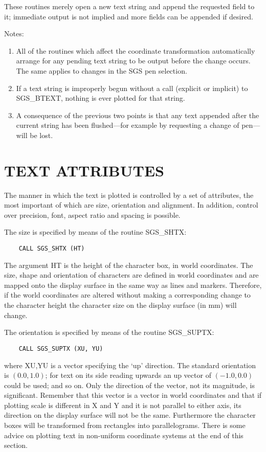 These routines merely open a new text string and append the
requested field to it;  immediate
output is not implied and more fields can be appended if
desired.

Notes:
\begin{enumerate}
\item All of the routines which affect the coordinate transformation
automatically arrange for any pending text string to
be output before the change occurs.  The same applies to
changes in the SGS pen selection.
\item If a text string is improperly begun without a call (explicit
or implicit) to SGS\_BTEXT, nothing is ever plotted for
that string.
\item A consequence of the previous two points is that any text
appended after the current string has been flushed---for
example by requesting a change of pen---will
be lost.
\end{enumerate}

\section {TEXT ATTRIBUTES}

The manner in which the text is plotted is controlled by a set
of attributes, the most important of which
are size, orientation and alignment.  In addition,
control over precision, font, aspect ratio and spacing is
possible.

The size is specified by means of the routine SGS\_SHTX:
\begin{verbatim}
    CALL SGS_SHTX (HT)
\end{verbatim}
The argument HT is the height of the character box, in world
coordinates.  The size, shape and orientation of characters are defined
in world coordinates and are mapped onto the display surface in
the same way as lines and markers.  Therefore, 
if the world coordinates are altered
without making a corresponding change to the character height the character
size on the display surface (in mm) will change.

The orientation is specified by means of the routine SGS\_SUPTX:
\begin{verbatim}
    CALL SGS_SUPTX (XU, YU)
\end{verbatim}
where XU,YU is a vector specifying the `up'
direction.  The standard orientation is $(0.0,1.0)$;  for
text on its side reading upwards an up vector of $(-1.0,0.0)$ could
be used;  and so on.  Only the direction of the vector, not its
magnitude, is significant.  Remember that this vector is a vector in world
coordinates and that if plotting scale is different in X and Y and it is
not parallel to either axis, its direction on the display surface will not 
be the same.  Furthermore the character boxes will be transformed from
rectangles into parallelograms.  There is some advice on plotting text in 
non-uniform coordinate systems at the end of this section.

